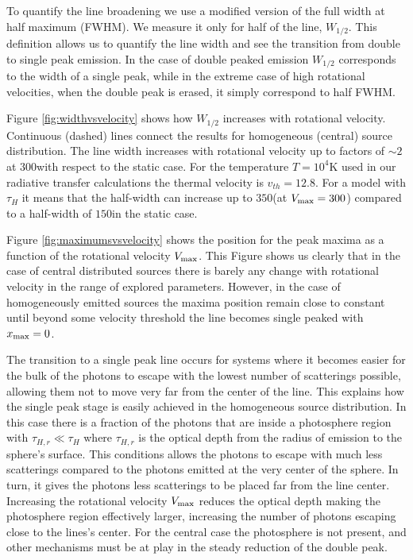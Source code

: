 \documentclass[usenatbib]{mn2e}
\newcommand{\kms}{{\ifmmode{{\mathrm{\,km\ s}^{-1}}}\else{\,km~s$^{-1}$}\fi}}
\begin{document}
To quantify the line broadening we use a modified version of the full
width at half maximum (FWHM). We measure it only for half of
the line, $W_{1/2}$. This definition allows us to quantify the line
width and see the transition from double to single peak emission.  In the
case of double peaked emission $W_{1/2}$ corresponds to the width of a
single peak, while in the extreme case of high rotational velocities,
when the double peak is erased, it simply correspond to half FWHM.  

Figure \ref{fig:widthvsvelocity} shows how $W_{1/2}$ increases with
rotational velocity. Continuous (dashed) lines connect the results for
homogeneous (central) source distribution. The line width increases
with rotational velocity up to factors of $\sim 2$ at $300$\kms with
respect to the static case. For the temperature $T=10^4$K used in our
radiative transfer calculations the thermal velocity is
$v_{th}=12.8$\kms. For a model with $\tau_{H}$ it means that the
half-width can increase up to $350$\kms (at $V_{\rm max}=300$\kms)
compared to a half-width of $150$\kms in the static case.  


Figure \ref{fig:maximumsvsvelocity} shows the position for the peak
maxima as a function of the rotational velocity $V_{\rm max}$. This
Figure shows us clearly that in the case of central distributed
sources there is barely any change with rotational velocity in the
range of explored parameters. However, in the case of
homogeneously emitted sources the maxima position remain close to
constant until beyond some velocity threshold the line becomes single
peaked with $x_{\rm max}=0$. 

The transition to a single peak line occurs for systems
where it  becomes easier for the bulk of the photons to escape with the lowest
number of scatterings possible, allowing them not to move very far
from the center of the line. This explains how the single peak stage
is easily achieved in the homogeneous source distribution. In this
case there is a fraction of the photons that are inside a photosphere
region with $\tau_{H,r}\ll \tau_{H}$ where $\tau_{H,r}$ is the optical
depth from the radius of emission to the sphere's surface. This
conditions allows the photons to escape with much less scatterings
compared to the photons emitted at the very center of the sphere. In
turn, it gives the photons less scatterings to be placed far from the
line center. Increasing the rotational velocity $V_{\rm max}$ reduces
the optical depth making the photosphere region effectively larger,
increasing the number of photons escaping close to the lines's
center. For the central case the photosphere is not present, and other
mechanisms must be at play in the steady reduction of the double peak.  
\end{document}
